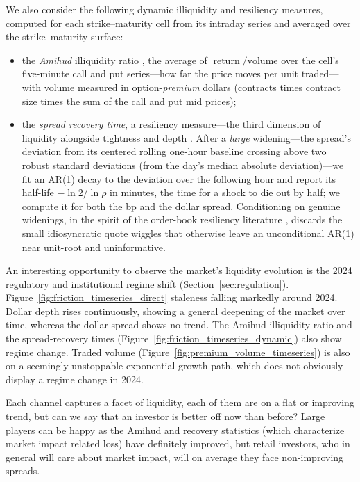 \documentclass[12pt]{article}
\begin{document}
We also consider the following dynamic illiquidity and resiliency measures, computed for each strike--maturity cell from its intraday series and averaged over the strike--maturity surface:
\begin{itemize}
  \item the \emph{Amihud} illiquidity ratio \citep{amihud2002illiquidity}, the average of $|\text{return}|/\text{volume}$ over the cell's five-minute call and put series---how far the price moves per unit traded---with volume measured in option-\emph{premium} dollars (contracts times contract size times the sum of the call and put mid prices);
  \item the \emph{spread recovery time}, a resiliency measure---the third dimension of liquidity alongside tightness and depth \citep{kyle1985continuous, foucault2013market}. After a \emph{large} widening---the spread's deviation from its centered rolling one-hour baseline crossing above two robust standard deviations (from the day's median absolute deviation)---we fit an AR(1) decay to the deviation over the following hour and report its half-life $-\ln 2/\ln\rho$ in minutes, the time for a shock to die out by half; we compute it for both the bp and the dollar spread. Conditioning on genuine widenings, in the spirit of the order-book resiliency literature \citep{degryse2005resiliency, large2007measuring}, discards the small idiosyncratic quote wiggles that otherwise leave an unconditional AR(1) near unit-root and uninformative.
\end{itemize}

An interesting opportunity to observe the market's liquidity evolution is the 2024 regulatory and institutional regime shift (Section~\ref{sec:regulation}). 
Figure~\ref{fig:friction_timeseries_direct} staleness falling markedly around 2024. Dollar depth rises continuously, showing a general deepening of the market over time, whereas the dollar spread shows no trend. The Amihud illiquidity ratio and the spread-recovery times (Figure~\ref{fig:friction_timeseries_dynamic}) also show regime change. Traded volume (Figure~\ref{fig:premium_volume_timeseries}) is also on a seemingly unstoppable exponential growth path, which does not obviously display a regime change in 2024. 

Each channel captures a facet of liquidity, each of them are on a flat or improving trend, but can we say that an investor is better off now than before? Large players can be happy as the Amihud and recovery statistics (which characterize market impact related loss) have definitely improved, but retail investors, who in general will care about market impact, will on average they face non-improving spreads.
\end{document}

